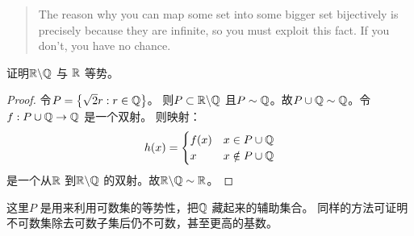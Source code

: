 \begin{quote}
    The reason why you can map some set into some bigger
    set bijectively is precisely because they are infinite,
    so you must exploit this fact. If you don't, you have no chance.
\end{quote}

\begin{problem}{}{}
    证明\(\mathbb{R}\backslash \mathbb{Q} \) 与 \(\mathbb{R}\) 等势。
\end{problem}

\begin{proof}
    令\(P=\left\{ \sqrt{2}r:r \in \mathbb{Q} \right\} \)。
    则\(P \subset \mathbb{R}\backslash \mathbb{Q}\) 且\(P\sim
    \mathbb{Q}\)。故\(P\cup \mathbb{Q}\sim \mathbb{Q}\)。令\(f: P\cup \mathbb{Q} \to \mathbb{Q}\) 是一个双射。
    则映射： \[
        h(x) =
        \begin{cases}
            f(x) & x\in P\cup \mathbb{Q} \\
            x & x \notin P\cup \mathbb{Q}
        \end{cases}
    \]
    是一个从\(\mathbb{R}\) 到\(\mathbb{R}\backslash \mathbb{Q}\) 的双射。故\(\mathbb{R}\backslash
    \mathbb{Q} \sim \mathbb{R}\)。
\end{proof}

这里\(P\) 是用来利用可数集的等势性，把\(\mathbb{Q}\) 藏起来的辅助集合。
同样的方法可证明不可数集除去可数子集后仍不可数，甚至更高的基数。







